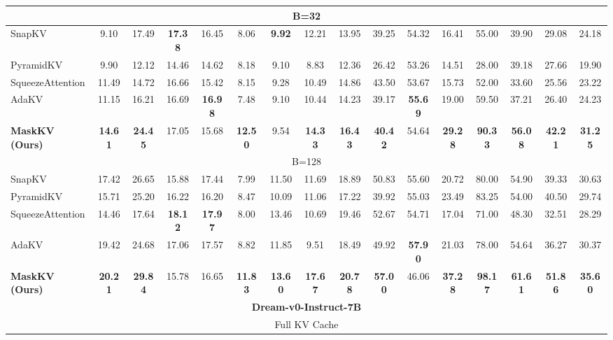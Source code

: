 \begin{table*}[t!]
{\begin{tabular}{@{}l*{15}{c}@{}}
        \midrule
        \multicolumn{16}{c}{\small B=32} \\
        \midrule
        SnapKV & 9.10 & 17.49 & \textbf{17.38} & 16.45 & 8.06 & \textbf{9.92} & 12.21 & 13.95 & 39.25 & 54.32 & 16.41 & 55.00 & 39.90 & 29.08 & 24.18 \\
        PyramidKV & 9.90 & 12.12 & 14.46 & 14.62 & 8.18 & 9.10 & 8.83 & 12.36 & 26.42 & 53.26 & 14.51 & 28.00 & 39.18 & 27.66 & 19.90 \\
        SqueezeAttention & 11.49 & 14.72 & 16.66 & 15.42 & 8.15 & 9.28 & 10.49 & 14.86 & 43.50 & 53.67 & 15.73 & 52.00 & 33.60 & 25.56 & 23.22 \\
        AdaKV & 11.15 & 16.21 & 16.69 & \textbf{16.98} & 7.48 & 9.10 & 10.44 & 14.23 & 39.17 & \textbf{55.69} & 19.00 & 59.50 & 37.21 & 26.40 & 24.23 \\
        \rowcolor{lightgreen} \textbf{MaskKV (Ours)} & \textbf{14.61} & \textbf{24.45} & 17.05 & 15.68 & \textbf{12.50} & 9.54 & \textbf{14.33} & \textbf{16.43} & \textbf{40.42} & 54.64 & \textbf{29.28} & \textbf{90.33} & \textbf{56.08} & \textbf{42.21} & \textbf{31.25} \\
        \midrule
        \multicolumn{16}{c}{\small B=128} \\
        \midrule
        SnapKV & 17.42 & 26.65 & 15.88 & 17.44 & 7.99 & 11.50 & 11.69 & 18.89 & 50.83 & 55.60 & 20.72 & 80.00 & 54.90 & 39.33 & 30.63 \\
        PyramidKV & 15.71 & 25.20 & 16.22 & 16.20 & 8.47 & 10.09 & 11.06 & 17.22 & 39.92 & 55.03 & 23.49 & 83.25 & 54.00 & 40.50 & 29.74 \\
        SqueezeAttention & 14.46 & 17.64 & \textbf{18.12} & \textbf{17.97} & 8.00 & 13.46 & 10.69 & 19.46 & 52.67 & 54.71 & 17.04 & 71.00 & 48.30 & 32.51 & 28.29 \\
        AdaKV & 19.42 & 24.68 & 17.06 & 17.57 & 8.82 & 11.85 & 9.51 & 18.49 & 49.92 & \textbf{57.90} & 21.03 & 78.00 & 54.64 & 36.27 & 30.37 \\
        \rowcolor{lightgreen} \textbf{MaskKV (Ours)} & \textbf{20.21} & \textbf{29.84} & 15.78 & 16.65 & \textbf{11.83} & \textbf{13.60} & \textbf{17.67} & \textbf{20.78} & \textbf{57.00} & 46.06 & \textbf{37.28} & \textbf{98.17} & \textbf{61.61} & \textbf{51.86} & \textbf{35.60} \\
        \midrule
        \multicolumn{16}{c}{\large \textbf{Dream-v0-Instruct-7B}} \\
        \midrule
        \multicolumn{16}{c}{\small Full KV Cache} \\

\end{tabular}}
\end{table*}
